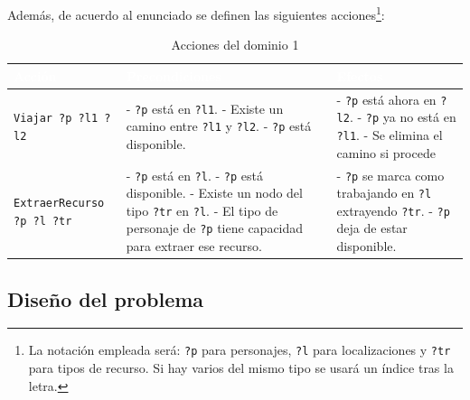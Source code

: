 \documentclass[10pt]{article}
\begin{document}
Además, de acuerdo al enunciado se definen las siguientes acciones\footnote{La notación empleada será: \texttt{?p} para personajes, \texttt{?l} para localizaciones y \texttt{?tr} para tipos de recurso. Si hay varios del mismo tipo se usará un índice tras la letra.}:
\begin{table}[H]
        \centering
        \begin{tabular}{| m{4cm} | m{6cm} | m{6cm} |}
            \hline
            \rowcolor{maincolor}
            \textcolor{white}{\textbf{Acción}} & 
            \centering\arraybackslash\textcolor{white}{\textbf{Precondiciones}} & 
            \textcolor{white}{\textbf{Efectos}} \\
            \hline
            \texttt{Viajar ?p ?l1 ?l2} & 
            - \texttt{?p} está en \texttt{?l1}. \newline
            - Existe un camino entre \texttt{?l1} y \texttt{?l2}. \newline
            - \texttt{?p} está disponible. &
            - \texttt{?p} está ahora en \texttt{?l2}.\newline
            - \texttt{?p} ya no está en \texttt{?l1}.\newline
            - Se elimina el camino si procede\\
            \hline
            \texttt{ExtraerRecurso ?p ?l ?tr} & 
            - \texttt{?p} está en \texttt{?l}. \newline
            - \texttt{?p} está disponible. \newline
            - Existe un nodo del tipo \texttt{?tr} en \texttt{?l}. \newline
            - El tipo de personaje de \texttt{?p} tiene capacidad para extraer ese recurso. &
            - \texttt{?p} se marca como trabajando en \texttt{?l} extrayendo \texttt{?tr}.\newline
            - \texttt{?p} deja de estar disponible.\\
            \hline
        \end{tabular}%
        \caption{Acciones del dominio 1}
        \label{tab:acciones_dom1} 
    \end{table}

\subsection{Diseño del problema}
\end{document}
